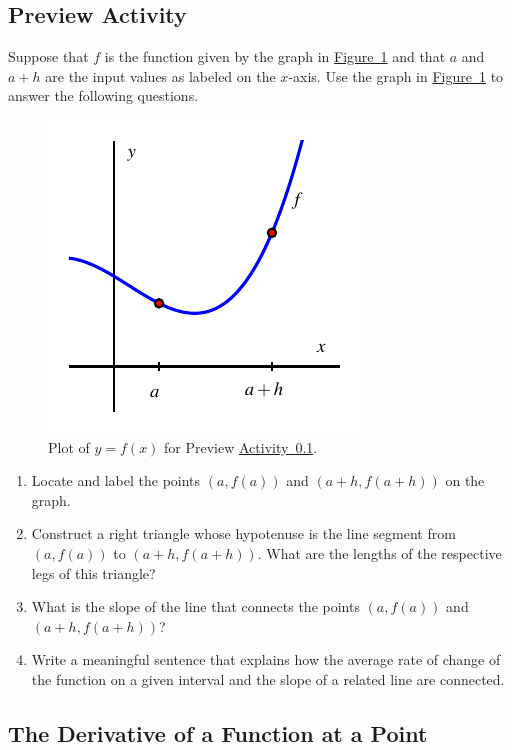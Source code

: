 \documentclass[10pt,]{book}
\theoremstyle{plain}
\theoremstyle{definition}
\theoremstyle{definition}
\theoremstyle{definition}
\theoremstyle{definition}
\theoremstyle{definition}
\numberwithin{equation}{section}
\begin{document}
\subsection[{Preview Activity}]{Preview Activity}\label{PA-1-3}
 Suppose that \(f\) is the function given by the graph in \hyperref[F-1-3-PA1]{Figure~\ref{F-1-3-PA1}} and that \(a\) and \(a+h\) are the input values as labeled on the \(x\)-axis. Use the graph in \hyperref[F-1-3-PA1]{Figure~\ref{F-1-3-PA1}} to answer the following questions.
\leavevmode%
\begin{figure}
\centering
\includegraphics[width=0.5\linewidth]{images/1_3_PA1}
\caption{Plot of \(y = f(x)\) for Preview \hyperref[PA-1-3]{Activity~\ref{PA-1-3}}.\label{F-1-3-PA1}}
\end{figure}
\leavevmode%
\begin{enumerate}[label=\alph*]
\item\hypertarget{li-116}{}Locate and label the points \((a,f(a))\) and \((a+h, f(a+h))\) on the graph.%
\item\hypertarget{li-117}{}Construct a right triangle whose hypotenuse is the line segment from \((a,f(a))\) to \((a+h,f(a+h))\).  What are the lengths of the respective legs of this triangle?%
\item\hypertarget{li-118}{}What is the slope of the line that connects the points \((a,f(a))\) and \((a+h, f(a+h))\)?%
\item\hypertarget{li-119}{}Write a meaningful sentence that explains how the average rate of change of the function on a given interval and the slope of a related line are connected.%
\end{enumerate}
\typeout{************************************************}
\typeout{************************************************}
\subsection[{The Derivative of a Function at a Point}]{The Derivative of a Function at a Point}\label{subsection-10}
\end{document}
